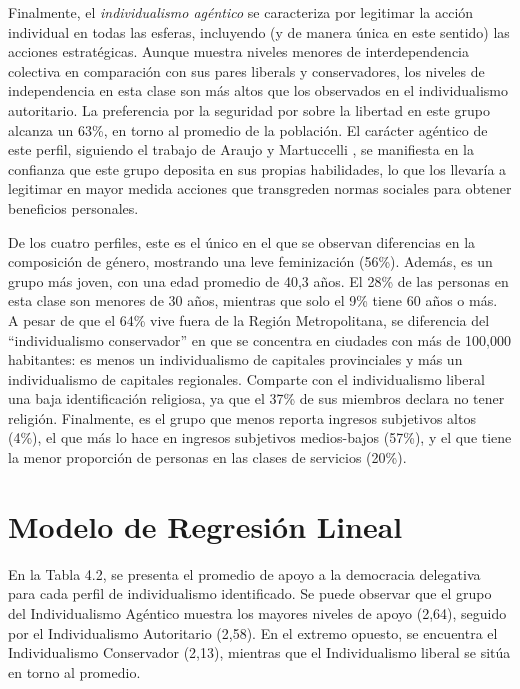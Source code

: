 \documentclass[12pt,twoside]{templates/facsothesis}
\begin{document}
Finalmente, el \emph{individualismo agéntico} se caracteriza por legitimar la acción individual en todas las esferas, incluyendo (y de manera única en este sentido) las acciones estratégicas. Aunque muestra niveles menores de interdependencia colectiva en comparación con sus pares liberals y conservadores, los niveles de independencia en esta clase son más altos que los observados en el individualismo autoritario. La preferencia por la seguridad por sobre la libertad en este grupo alcanza un 63\%, en torno al promedio de la población. El carácter agéntico de este perfil, siguiendo el trabajo de Araujo y Martuccelli \citeyearpar{araujo2012}, se manifiesta en la confianza que este grupo deposita en sus propias habilidades, lo que los llevaría a legitimar en mayor medida acciones que transgreden normas sociales para obtener beneficios personales.

De los cuatro perfiles, este es el único en el que se observan diferencias en la composición de género, mostrando una leve feminización (56\%). Además, es un grupo más joven, con una edad promedio de 40,3 años. El 28\% de las personas en esta clase son menores de 30 años, mientras que solo el 9\% tiene 60 años o más. A pesar de que el 64\% vive fuera de la Región Metropolitana, se diferencia del ``individualismo conservador'' en que se concentra en ciudades con más de 100,000 habitantes: es menos un individualismo de capitales provinciales y más un individualismo de capitales regionales. Comparte con el individualismo liberal una baja identificación religiosa, ya que el 37\% de sus miembros declara no tener religión. Finalmente, es el grupo que menos reporta ingresos subjetivos altos (4\%), el que más lo hace en ingresos subjetivos medios-bajos (57\%), y el que tiene la menor proporción de personas en las clases de servicios (20\%).

\hypertarget{modelo-de-regresiuxf3n-lineal-1}{%
\section{Modelo de Regresión Lineal}\label{modelo-de-regresiuxf3n-lineal-1}}

En la Tabla 4.2, se presenta el promedio de apoyo a la democracia delegativa para cada perfil de individualismo identificado. Se puede observar que el grupo del Individualismo Agéntico muestra los mayores niveles de apoyo (2,64), seguido por el Individualismo Autoritario (2,58). En el extremo opuesto, se encuentra el Individualismo Conservador (2,13), mientras que el Individualismo liberal se sitúa en torno al promedio.
\end{document}

